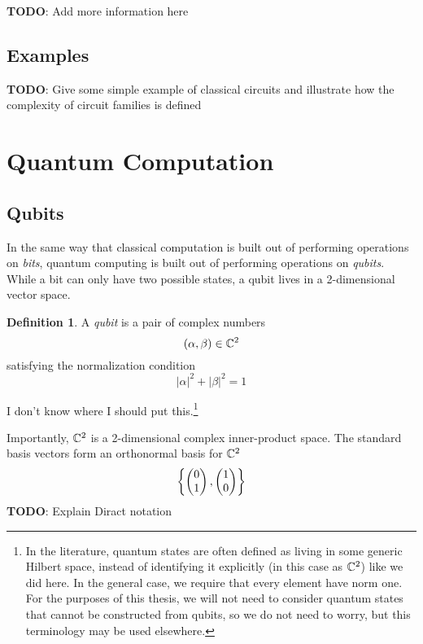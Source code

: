 \documentclass[12pt,twoside]{reedthesis}
\theoremstyle{definition}\newtheorem{definition}{Definition}
\theoremstyle{definition}\newtheorem{example}{Example}
\newcommand{\TODO}[1]{{ \color{red} \textbf{TODO}: {#1}}}
\begin{document}
        \TODO{Add more information here}


    \subsection{Examples}
        \TODO{Give some simple example of classical circuits and illustrate how the complexity of circuit families is defined}



    \section{Quantum Computation}

    \subsection{Qubits}
    In the same way that classical computation is built out of performing operations on \emph{bits}, quantum computing is built out of performing operations on \emph{qubits}. While a bit can only have two possible states, a qubit lives in a 2-dimensional vector space.

    \begin{definition}
        A \emph{qubit} is a pair of complex numbers
            \[
                (\alpha, \beta) \in \mathbb{C}^2
            \]
        satisfying the normalization condition
        \[
            |\alpha|^2 + |\beta|^2 = 1
        \]
    \end{definition}









    I don't know where I should put this.\footnote{In the literature, quantum states are often defined as living in some generic Hilbert space, instead of identifying it explicitly (in this case as $\mathbb{C}^2$) like we did here. In the general case, we require that every element have norm one. For the purposes of this thesis, we will not need to consider quantum states that cannot be constructed from qubits, so we do not need to worry, but this terminology may be used elsewhere.}



        Importantly, $\mathbb{C}^2$ is a 2-dimensional complex inner-product space. The standard basis vectors form an orthonormal basis for $\mathbb{C}^2$
        \[
            \left\{\begin{pmatrix} 0 \\ 1 \end{pmatrix}, \begin{pmatrix} 1 \\ 0 \end{pmatrix}\right\}
        \]
        \TODO{Explain Diract notation}
\end{document}
